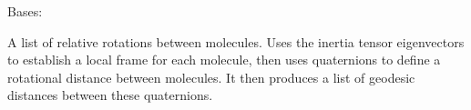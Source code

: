 \documentclass[letterpaper,10pt,english]{sphinxmanual}
\begin{document}
\begin{fulllineitems}
\label{doctree/soprano.properties.linkage.linkage:soprano.properties.linkage.linkage.MoleculeRelativeRotation}
Bases: {\hyperref[doctree/soprano.properties.atomsproperty:soprano.properties.atomsproperty.AtomsProperty]{\emph{}}}

A list of relative rotations between molecules. Uses the inertia tensor
eigenvectors to establish a local frame for each molecule, then uses
quaternions to define a rotational distance between molecules. It then
produces a list of geodesic distances between these quaternions.


\end{fulllineitems}
\end{document}
